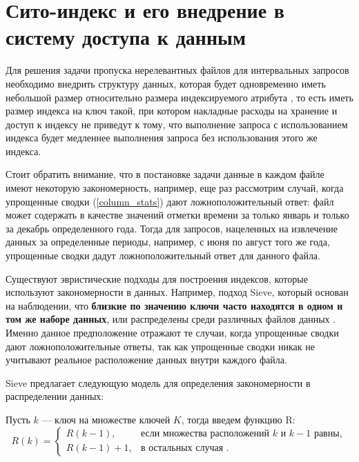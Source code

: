 \section{Сито-индекс и его внедрение в систему доступа к данным}

Для решения задачи пропуска нерелевантных файлов для интервальных запросов необходимо внедрить структуру данных, которая будет одновременно иметь небольшой размер относительно размера индексируемого атрибута , то есть иметь размер индекса на ключ  такой, при котором накладные расходы на хранение и доступ к индексу не приведут к тому, что выполнение запроса с использованием индекса будет медленнее выполнения запроса без использования этого же индекса.

Стоит обратить внимание, что в постановке задачи  данные в каждом файле имеют некоторую закономерность, например, еще раз рассмотрим случай, когда упрощенные сводки (\ref{column_stats}) дают ложноположительный ответ: файл может содержать в качестве значений отметки времени за только январь и только за декабрь определенного года. Тогда для запросов, нацеленных на извлечение данных за определенные периоды, например, с июня по август того же года, упрощенные сводки дадут ложноположительный ответ для данного файла.

Существуют эвристические подходы для построения индексов, которые используют закономерности в данных. Например, подход Sieve, который основан на наблюдении, что \textbf{близкие по значению ключи часто находятся в одном и том же наборе данных}, или распределены среди различных файлов данных \cite{Sieve}. Именно данное предположение отражают те случаи, когда упрощенные сводки дают ложноположительные ответы, так как упрощенные сводки никак не учитывают реальное расположение данных внутри каждого файла.

Sieve предлагает следующую модель для определения закономерности в распределении данных:

Пусть $k$ --- ключ на множестве ключей $K$, тогда введем функцию R:
\begin{equation}\label{R_CDF}
R(k) = 
\begin{cases} 
    R(k - 1), & \text{если множества расположений $k$ и $k - 1$ равны}, \\
    R(k - 1) + 1, & \text{в остальных случая }.
\end{cases}
\end{equation}

